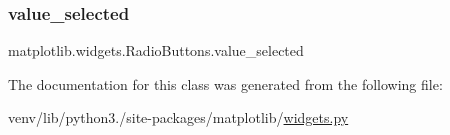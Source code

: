 \mbox{\label{classmatplotlib_1_1widgets_1_1RadioButtons_adac6c1a025207ffe807ba00155316672}} 
\subsubsection{\texorpdfstring{value\+\_\+selected}{value\_selected}}
{\footnotesize\ttfamily matplotlib.\+widgets.\+Radio\+Buttons.\+value\+\_\+selected}



The documentation for this class was generated from the following file\+:\begin{DoxyCompactItemize}
\item 
venv/lib/python3./site-\/packages/matplotlib/\hyperlink{widgets_8py}{widgets.\+py}\end{DoxyCompactItemize}
